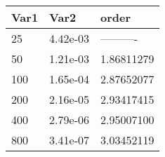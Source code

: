 \begin{tabular}{lll}
Var1 & Var2 & order \\ 
\hline 
25 & 4.42e-03 & ---------- \\ 
50 & 1.21e-03 & 1.86811279 \\ 
100 & 1.65e-04 & 2.87652077 \\ 
200 & 2.16e-05 & 2.93417415 \\ 
400 & 2.79e-06 & 2.95007100 \\ 
800 & 3.41e-07 & 3.03452119 \\ 
\hline 
\end{tabular}